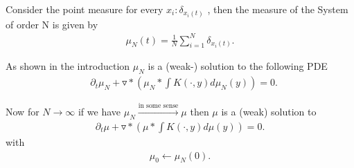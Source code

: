 \begin{definition}\label{empirical_measure}
  Consider the point measure for every $x_i : \delta_{x_{i}(t)}$ , then the measure of the System of order N is given by
 \begin{align*}
   \mu_N(t) = \frac{1}{N} \sum_{i=1}^{N} \delta_{x_{i}(t)}
 .\end{align*}
\end{definition}
As shown in the introduction $\mu_N$ is a (weak-) solution to the  following PDE 
\begin{align*}
  &\partial_t \mu_N + \triangledown * (\mu_N * \int K(\cdot,y)d \mu_N(y)) = 0
  .\end{align*}
\begin{intuition}
  Now for $N\to \infty$ if we have $\mu_N \xrightarrow{\text{in some sense}} \mu $   then $\mu $ is a (weak) solution to 
  \begin{align*}
    \partial_t \mu + \triangledown * (\mu * \int K(\cdot,y)d \mu(y)) = 0
  .\end{align*}
  with 
  \begin{align*}
    \mu_0 \leftarrow \mu_N(0)
  .\end{align*}
\end{intuition}
